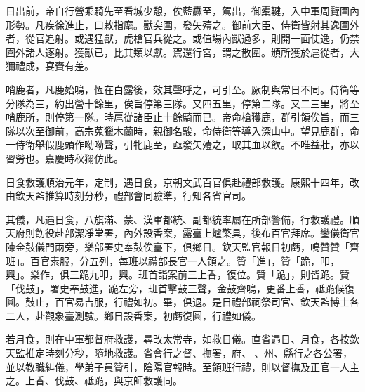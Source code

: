 \begin{pinyinscope}
日出前，帝自行營乘騎先至看城少憩，俟藍纛至，駕出，御櫜鞬，入中軍周覽圍內形勢。凡疾徐進止，口敕指麾。獸突圍，發矢殪之。御前大臣、侍衛皆射其逸圍外者，從官追射。或遇猛獸，虎槍官兵從之。或值場內獸過多，則開一面使逸，仍禁圍外諸人逐射。獲獸已，比其類以獻。駕還行宮，謂之散圍。頒所獲於扈從者，大獮禮成，宴賚有差。

哨鹿者，凡鹿始鳴，恆在白露後，效其聲呼之，可引至。厥制與常日不同。侍衛等分隊為三，約出營十餘里，俟旨停第三隊。又四五里，停第二隊。又二三里，將至哨鹿所，則停第一隊。時扈從諸臣止十餘騎而已。帝命槍獲鹿，群引領俟旨，而三隊以次至御前，高宗蒐獵木蘭時，親御名駿，命侍衛等導入深山中。望見鹿群，命一侍衛舉假鹿頭作呦呦聲，引牝鹿至，亟發矢殪之，取其血以飲。不唯益壯，亦以習勞也。嘉慶時秋獮仿此。

日食救護順治元年，定制，遇日食，京朝文武百官俱赴禮部救護。康熙十四年，改由欽天監推算時刻分秒，禮部會同驗準，行知各省官司。

其儀，凡遇日食，八旗滿、蒙、漢軍都統、副都統率屬在所部警備，行救護禮。順天府則飭役赴部潔凈堂署，內外設香案，露臺上爐檠具，後布百官拜席。鑾儀衛官陳金鼓儀門兩旁，樂部署史奉鼓俟臺下，俱鄉日。欽天監官報日初虧，鳴贊贊「齊班」。百官素服，分五列，每班以禮部長官一人領之。贊「進」，贊「跪，叩，興」。樂作，俱三跪九叩，興。班首詣案前三上香，復位。贊「跪」，則皆跪。贊「伐鼓」，署史奉鼓進，跪左旁，班首擊鼓三聲，金鼓齊鳴，更番上香，祗跪候復圓。鼓止，百官易吉服，行禮如初。畢，俱退。是日禮部祠祭司官、欽天監博士各二人，赴觀象臺測驗。鄉日設香案，初虧復圓，行禮如儀。

若月食，則在中軍都督府救護，尋改太常寺，如救日儀。直省遇日、月食，各按欽天監推定時刻分秒，隨地救護。省會行之督、撫署，府、、州、縣行之各公署，並以教職糾儀，學弟子員贊引，陰陽官報時。至領班行禮，則以督撫及正官一人主之。上香、伐鼓、祗跪，與京師救護同。


\end{pinyinscope}